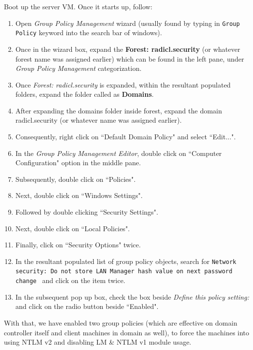 \documentclass[12pt]{extarticle}
\begin{document}
\begin{enumerate}
	Boot up the server VM. Once it starts up, follow:
	
	\begin{enumerate}
		\item Open \textit{Group Policy Management} wizard (usually found by typing in \texttt{Group Policy} keyword into the search bar of windows).
		\item Once in the wizard box, expand the \textbf{Forest: radicl.security} (or whatever forest name was assigned earlier) which can be found in the left pane, under \textit{Group Policy Management} categorization.
		\item Once \textit{Forest: radicl.security} is expanded, within the resultant populated folders, expand the folder called as \textbf{Domains}.
		\item After expanding the domains folder inside forest, expand the domain radicl.security (or whatever name was assigned earlier).
		\item Consequently, right click on ``Default Domain Policy" and select ``Edit...".
		\item In the \textit{Group Policy Management Editor}, double click on ``Computer Configuration" option in the middle pane.
		\item Subsequently, double click on ``Policies".
		\item Next, double click on ``Windows Settings".
		\item Followed by double clicking ``Security Settings".
		\item Next, double click on ``Local Policies".
		\item Finally, click on ``Security Options" twice.
		\item In the resultant populated list of group policy objects, search for \texttt{Network security: Do not store LAN Manager hash value on next password change } and click on the item twice.
		\item In the subsequent pop up box, check the box beside \textit{Define this policy setting:} and click on the radio button beside ``Enabled". 
	\end{enumerate}
	
	With that, we have enabled two group policies (which are effective on domain controller itself and client machines in domain as well), to force the machines into using NTLM v2 and disabling LM \& NTLM v1 module usage.
	
\end{enumerate}


\end{document}
